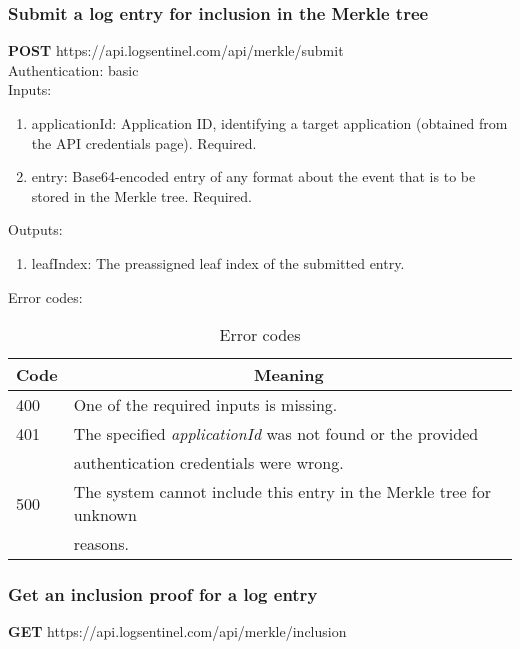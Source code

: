 \documentclass{article}
\begin{document}
		\subsubsection{Submit a log entry for inclusion in the Merkle tree}
		
		\textbf{POST} https://api.logsentinel.com/api/merkle/submit \\
		
		\noindent Authentication: basic \\
		
		\noindent Inputs:
		\begin{enumerate}
			\item applicationId: Application ID, identifying a target application (obtained from the API credentials page). Required.
			\item entry: Base64-encoded entry of any format about the event that is to be stored in the Merkle tree. Required.
		\end{enumerate}
		
		\noindent Outputs:
		\begin{enumerate}
			\item leafIndex: The preassigned leaf index of the submitted entry.
		\end{enumerate}
	
		\noindent Error codes:
		\begin{table}[H]
			\centering
			\caption{Error codes}
			\label{merkle-submit-error-codes}
			\begin{tabular}{|l|l|}
				\hline
				\multicolumn{1}{|c|}{Code} & 	\multicolumn{1}{c|}{Meaning} \\ \hline
				400 & One of the required inputs is missing. \\ \hline
				401 & The specified \textit{applicationId} was not found or the provided \\
				& authentication credentials were wrong. \\ \hline
				500 & The system cannot include this entry in the Merkle tree for unknown \\ & reasons. \\ \hline
			\end{tabular}
		\end{table}
	
		\subsubsection{Get an inclusion proof for a log entry}
	
		\textbf{GET} https://api.logsentinel.com/api/merkle/inclusion \\
		
\end{document}
